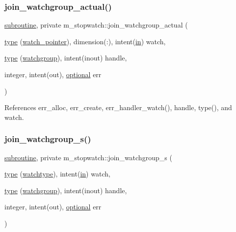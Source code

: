 \subsubsection{\texorpdfstring{join\+\_\+watchgroup\+\_\+actual()}{join\_watchgroup\_actual()}}
{\footnotesize\ttfamily \hyperlink{M__stopwatch_83_8txt_acfbcff50169d691ff02d4a123ed70482}{subroutine}, private m\+\_\+stopwatch\+::join\+\_\+watchgroup\+\_\+actual (\begin{DoxyParamCaption}\item[{\hyperlink{stop__watch_83_8txt_a70f0ead91c32e25323c03265aa302c1c}{type} (\hyperlink{structm__stopwatch_1_1watch__pointer}{watch\+\_\+pointer}), dimension(\+:), intent(\hyperlink{M__journal_83_8txt_afce72651d1eed785a2132bee863b2f38}{in})}]{watch,  }\item[{\hyperlink{stop__watch_83_8txt_a70f0ead91c32e25323c03265aa302c1c}{type} (\hyperlink{structm__stopwatch_1_1watchgroup}{watchgroup}), intent(inout)}]{handle,  }\item[{integer, intent(out), \hyperlink{option__stopwatch_83_8txt_aa4ece75e7acf58a4843f70fe18c3ade5}{optional}}]{err }\end{DoxyParamCaption})\hspace{0.3cm}{\ttfamily [private]}}



References err\+\_\+alloc, err\+\_\+create, err\+\_\+handler\+\_\+watch(), handle, type(), and watch.

\mbox{\label{namespacem__stopwatch_ab3cc8ca14a1c99895e0dec06d0119cac}} 
\subsubsection{\texorpdfstring{join\+\_\+watchgroup\+\_\+s()}{join\_watchgroup\_s()}}
{\footnotesize\ttfamily \hyperlink{M__stopwatch_83_8txt_acfbcff50169d691ff02d4a123ed70482}{subroutine}, private m\+\_\+stopwatch\+::join\+\_\+watchgroup\+\_\+s (\begin{DoxyParamCaption}\item[{\hyperlink{stop__watch_83_8txt_a70f0ead91c32e25323c03265aa302c1c}{type} (\hyperlink{structm__stopwatch_1_1watchtype}{watchtype}), intent(\hyperlink{M__journal_83_8txt_afce72651d1eed785a2132bee863b2f38}{in})}]{watch,  }\item[{\hyperlink{stop__watch_83_8txt_a70f0ead91c32e25323c03265aa302c1c}{type} (\hyperlink{structm__stopwatch_1_1watchgroup}{watchgroup}), intent(inout)}]{handle,  }\item[{integer, intent(out), \hyperlink{option__stopwatch_83_8txt_aa4ece75e7acf58a4843f70fe18c3ade5}{optional}}]{err }\end{DoxyParamCaption})\hspace{0.3cm}{\ttfamily [private]}}



